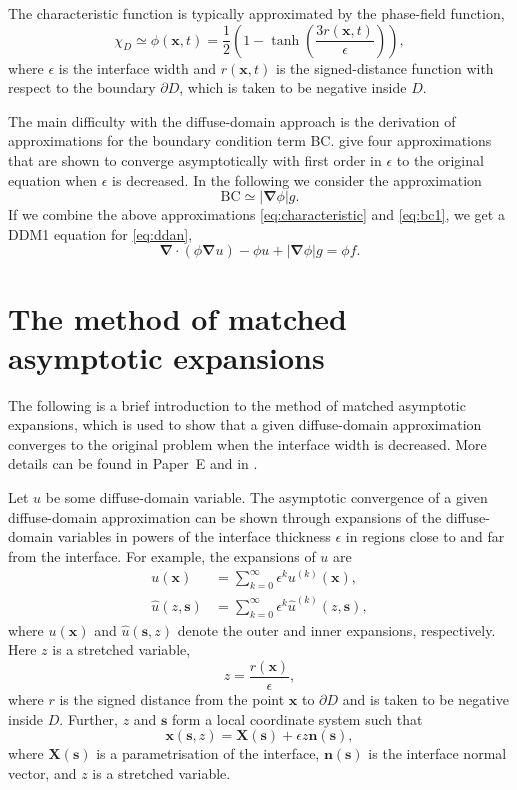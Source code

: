 \documentclass[11pt,b5paper,DIV=calc,BCOR1.3cm,headings=small,%
               footinclude=false,headsepline]{scrbook}
\newcommand*{\vct}[1]{\ensuremath{\boldsymbol{#1}}}
\newcommand*{\del}{\boldsymbol\nabla}
\renewcommand*{\div}{\del\cdot}
\newcommand*{\grad}{\del}
\begin{document}
The characteristic function is typically approximated by the phase-field
function,
\begin{equation}
  \chi_D \simeq \phi(\vct x,t) = \frac{1}{2} \left( 1
  - \tanh \left( \frac{3r(\vct x,t)}{\epsilon} \right) \right),
  \label{eq:characteristic}
\end{equation}
where $\epsilon$ is the interface width and $r(\vct x,t)$ is the
signed-distance function with respect to the boundary $\partial D$, which is
taken to be negative inside $D$.

The main difficulty with the diffuse-domain approach is the derivation of
approximations for the boundary condition term BC.  \citet{Li09} give four
approximations that are shown to converge asymptotically with first order in
$\epsilon$ to the original equation when $\epsilon$ is decreased.  In the
following we consider the approximation
\begin{equation}
  \text{BC} \simeq |\grad\phi| g.
  \label{eq:bc1}
\end{equation}
If we combine the above approximations \eqref{eq:characteristic} and
\eqref{eq:bc1}, we get a DDM1 equation for \eqref{eq:ddan},
\begin{equation}
  \div\left(\phi\grad u\right) - \phi u +  |\grad\phi| g = \phi f.
  \label{eq:ddm1}
\end{equation}

\section{The method of matched asymptotic expansions}
The following is a brief introduction to the method of matched asymptotic
expansions, which is used to show that a given diffuse-domain approximation
converges to the original problem when the interface width is decreased.  More
details can be found in Paper~E and in \cite{Pego88}.

Let $u$ be some diffuse-domain variable.  The asymptotic convergence of a given
diffuse-domain approximation can be shown through expansions of the
diffuse-domain variables in powers of the interface thickness $\epsilon$ in
regions close to and far from the interface.  For example, the expansions of
$u$ are
\begin{align}
  u(\vct x)        &= \sum_{k=0}^\infty \epsilon^k      u^{(k)}(\vct x), \\
  \hat u(z,\vct s) &= \sum_{k=0}^\infty \epsilon^k \hat u^{(k)}(z,\vct s),
\end{align}
where $u(\vct x)$ and $\hat u(\vct s,z)$ denote the outer and inner expansions,
respectively.  Here $z$ is a stretched variable,
\begin{equation}
  z = \frac{r(\vct x)}{\epsilon},
\end{equation}
where $r$ is the signed distance from the point $\vct x$ to $\partial D$ and is
taken to be negative inside $D$.  Further, $z$ and $\vct s$ form a local
coordinate system such that
\begin{equation}
  \vct x(\vct s,z) = \vct X(\vct s) + \epsilon z\vct n(\vct s),
\end{equation}
where $\vct X(\vct s)$ is a parametrisation of the interface, $\vct n(\vct s)$
is the interface normal vector, and $z$ is a stretched variable.
\end{document}
